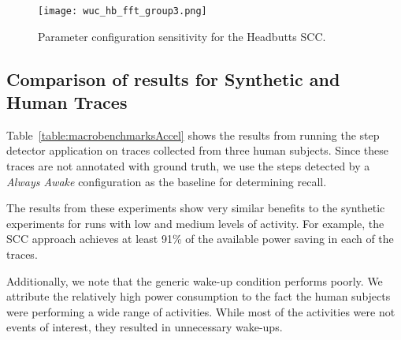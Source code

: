 \begin{figure}[h]
	\texttt{[image: wuc\_hb\_fft\_group3.png]}
	\caption{Parameter configuration sensitivity for the Headbutts SCC.}
    \label{fig:wucHeadbuttFFTRecallPowerGroup3}
\end{figure}


\subsection{Comparison of results for Synthetic and Human Traces}

Table~\ref{table:macrobenchmarksAccel} shows the results from running the
step detector application on traces collected from three human
subjects.  Since these traces are not annotated with ground truth, we
use the steps detected by a {\em Always Awake} configuration as the baseline for
determining recall.

The results from these experiments show very similar
benefits to the synthetic experiments for runs with low and medium
levels of activity.  For example, the SCC approach achieves
at least 91\% of the available power saving in each of the traces.  

Additionally, we note that the generic wake-up condition performs poorly.  We 
attribute the relatively high power consumption to the fact the human subjects 
were performing a wide range of activities.  While most of the activities were 
not events of interest, they resulted in unnecessary wake-ups.



